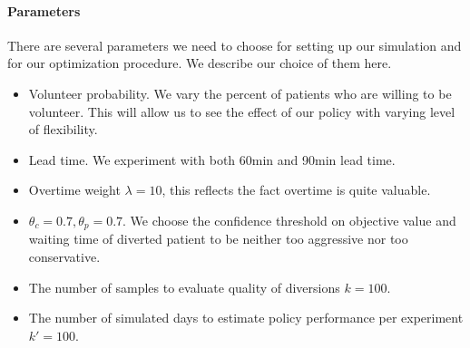 \paragraph{Parameters}

There are several parameters we need to choose for setting up our simulation
and for our optimization procedure. We describe our choice of them here.

\begin{itemize}
  \item Volunteer probability. We vary the percent of patients who are willing
    to be volunteer. This will allow us to see the effect of our policy
    with varying level of flexibility.
  \item Lead time. We experiment with both 60min and 90min lead time.
  \item Overtime weight $\lambda = 10$, this reflects the fact overtime is quite valuable.
  \item $\theta_c = 0.7, \theta_p = 0.7$. We choose the confidence threshold on objective value
    and waiting time of diverted patient to be neither too aggressive nor too conservative.
  \item The number of samples to evaluate quality of diversions $k=100$.
  \item The number of simulated days to estimate policy performance per experiment $k'=100$.
\end{itemize}
